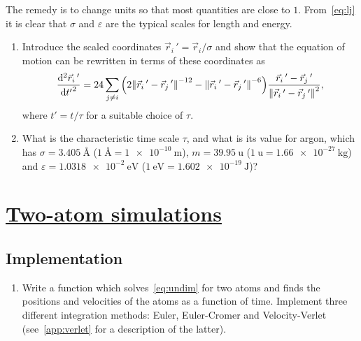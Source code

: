 \documentclass[11pt,british,a4paper]{report}
\begin{document}
The remedy is to change units so that most quantities are close to \(1\). From~\vref{eq:lj} it is clear that \(\sigma\) and \(\varepsilon\) are the typical scales for length and energy.

\begin{enumerate}[label=\roman*.]
    \item Introduce the scaled coordinates \(\vec{r}_i\,'=\vec{r}_i/\sigma\) and show that the equation of motion can be rewritten in terms of these coordinates as
    \begin{equation}
        \dv[2]{\vec{r}_i\,'}{{t'}} = 24 \sum_{j \neq i} \qty(2\norm{\vec{r}_i\,'-\vec{r}_j\,'}^{-12}-\norm{\vec{r}_i\,'-\vec{r}_j\,'}^{-6})\frac{\vec{r}_i\,'-\vec{r}_j\,'}{\norm{\vec{r}_i\,'-\vec{r}_j\,'}^2},\label{eq:undim}
    \end{equation}
    where \(t'=t/\tau\) for a suitable choice of \(\tau\).
    \item What is the characteristic time scale \(\tau\), and what is its value for argon, which has \(\sigma=\SI{3.405}{\angstrom}\) (\(\SI{1}{\angstrom}=\SI{1e-10}{\m}\)), \(m = \SI{39.95}{\atomicmassunit}\) (\(\SI{1}{\atomicmassunit} = \SI{1.66e-27}{\kg}\)) and \(\varepsilon=\SI{1.0318e-2}{\eV}\) (\(\SI{1}{\eV}=\SI{1.602e-19}{\J}\))?
\end{enumerate}



\section{\underline{Two-atom simulations}}

\subsection{Implementation}
\begin{enumerate}[label=\roman*.]
    \item Write a function which solves~\vref{eq:undim} for two atoms and finds the positions and velocities of the atoms as a function of time. Implement three different integration methods:
        Euler, Euler-Cromer and Velocity-Verlet (see~\vref{app:verlet} for a description of the latter).
\end{enumerate}
\end{document}
